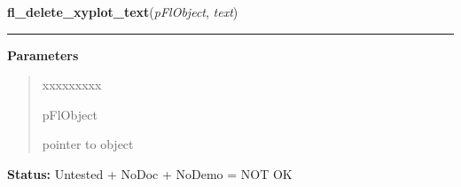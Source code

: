     \label{xformslib:flxyplot:fl_delete_xyplot_text}

    \vspace{0.5ex}

\hspace{.8\funcindent}\begin{boxedminipage}{\funcwidth}

    \raggedright \textbf{fl\_delete\_xyplot\_text}(\textit{pFlObject}, \textit{text})

    \vspace{-1.5ex}

    \rule{\textwidth}{0.5\fboxrule}
\setlength{\parskip}{2ex}
\setlength{\parskip}{1ex}
      \textbf{Parameters}
      \vspace{-1ex}

      \begin{quote}
        \begin{Ventry}{xxxxxxxxx}

          \item[pFlObject]

          pointer to object

        \end{Ventry}

      \end{quote}

\textbf{Status:} Untested + NoDoc + NoDemo = NOT OK



    \end{boxedminipage}

    \label{xformslib:flxyplot:fl_set_xyplot_maxoverlays}

    \vspace{0.5ex}

